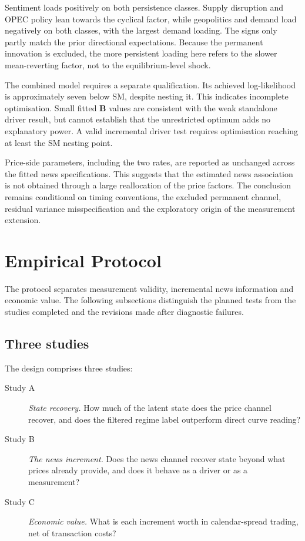 \documentclass[journal]{IEEEtran}
\begin{document}
Sentiment loads positively on both persistence classes. Supply disruption and OPEC policy lean towards the cyclical factor, while geopolitics and demand load negatively on both classes, with the largest demand loading. The signs only partly match the prior directional expectations. Because the permanent innovation is excluded, the more persistent loading here refers to the slower mean-reverting factor, not to the equilibrium-level shock.

The combined model requires a separate qualification. Its achieved log-likelihood is approximately seven below $\mathrm{SM}$, despite nesting it. This indicates incomplete optimisation. Small fitted $\bm{B}$ values are consistent with the weak standalone driver result, but cannot establish that the unrestricted optimum adds no explanatory power. A valid incremental driver test requires optimisation reaching at least the $\mathrm{SM}$ nesting point.

Price-side parameters, including the two rates, are reported as unchanged across the fitted news specifications. This suggests that the estimated news association is not obtained through a large reallocation of the price factors. The conclusion remains conditional on timing conventions, the excluded permanent channel, residual variance misspecification and the exploratory origin of the measurement extension.

\section{Empirical Protocol}
\label{sec:protocol}

The protocol separates measurement validity, incremental news information and economic value. The following subsections distinguish the planned tests from the studies completed and the revisions made after diagnostic failures.

\subsection{Three studies}

The design comprises three studies:
\begin{description}
  \item[Study A] \emph{State recovery.} How much of the latent state does the price channel recover, and does the filtered regime label outperform direct curve reading?
  \item[Study B] \emph{The news increment.} Does the news channel recover state beyond what prices already provide, and does it behave as a driver or as a measurement?
  \item[Study C] \emph{Economic value.} What is each increment worth in calendar-spread trading, net of transaction costs?
\end{description}
\end{document}
